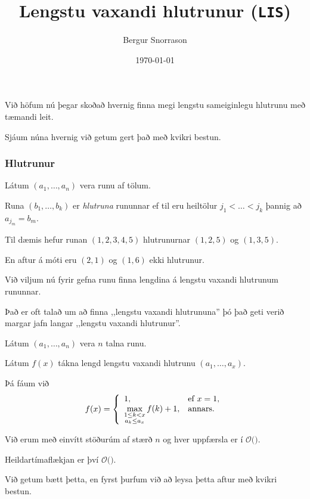 \title{Lengstu vaxandi hlutrunur (\texttt{LIS})}
\author{Bergur Snorrason}
\date{\today}



\frame{\titlepage}

{
	{
		\item<1-> Við höfum nú þegar skoðað hvernig finna megi lengstu sameiginlegu hlutrunu með tæmandi leit.
		\item<2-> Sjáum núna hvernig við getum gert það með kvikri bestun.
	}
}

{
	\frametitle{Hlutrunur}
	{
		\item<1-> Látum $(a_1, \dots, a_n)$ vera runu af tölum.
		\item<2-> Runa $(b_1, \dots, b_k)$ er \emph{hlutruna} rununnar ef til eru heiltölur $j_1 < \dots < j_k$ þannig að $a_{j_m} = b_m$.
		\item<3-> Til dæmis hefur runan $(1, 2, 3, 4, 5)$ hlutrunurnar $(1, 2, 5)$ og $(1, 3, 5)$.
		\item<4-> En aftur á móti eru $(2, 1)$ og $(1, 6)$ ekki hlutrunur.
		\item<5-> Við viljum nú fyrir gefna runu finna lengdina á lengstu vaxandi hlutrunum rununnar.
		\item<6-> Það er oft talað um að finna ,,lengstu vaxandi hlutrununa'' þó það geti verið margar jafn langar ,,lengstu vaxandi hlutrunur''.
	}
}

{
	{
		\item<1-> Látum $(a_1, \dots, a_n)$ vera $n$ talna runu.
		\item<2-> Látum $f(x)$ tákna lengd lengstu vaxandi hlutrunu $(a_1, \dots, a_x)$.
		\item<3-> Þá fáum við
		\[
			f(x) = \left \{
			\env{array}
			{ {l l}
				1, & \text{ef $x = 1$,} \\
				\displaystyle \max_{\substack{1 \leq k < x\\a_k \leq a_x}} f(k) + 1, & \text{annars.}
			}
			\right .
		\]
	}
}

{
}

{
	{
		\item<1-> Við erum með einvítt stöðurúm af stærð $n$ og hver uppfærsla er í $\mathcal{O}($\onslide<2->{$\,n\,$}$)$.
		\item<3-> Heildartímaflækjan er því $\mathcal{O}($\onslide<4->{$n^2$}$)$.
		\item<5-> Við getum bætt þetta, en fyrst þurfum við að leysa þetta aftur með kvikri bestun.
	}
}

